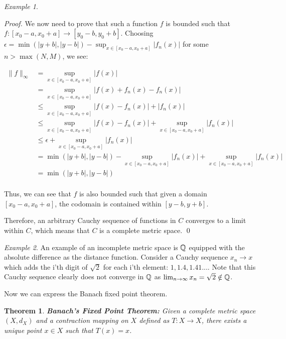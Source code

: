 \documentclass{article}
\newtheorem{theorem}{Theorem}[section]
\theoremstyle{remark}
\newtheorem{example}{Example}
\begin{document}
\begin{example}
\begin{proof}
    We now need to prove that such a function $f$ is bounded such that $f: [x_0 -a, x_0+a] \to [y_0 -b, y_0+b]$. Choosing $\epsilon  = \min(|y+b|, |y-b|) - \sup_{x\in [x_0 -a, x_0+a]} |f_n(x)|$ for some $n>\max(N,M)$, we see:

\begin{align*}
\|f\|_\infty &= \sup_{x\in [x_0 -a, x_0+a]} |f(x)| \\
             &= \sup_{x\in [x_0 -a, x_0+a]} |f(x) + f_n(x) - f_n(x)|\\
             &\leq \sup_{x\in [x_0 -a, x_0+a]} |f(x) -f_n(x)| + | f_n(x)| \\
             &\leq \sup_{x\in [x_0 -a, x_0+a]} |f(x) -f_n(x)| + \sup_{x\in [x_0 -a, x_0+a]}| f_n(x)|\\
             &\leq \epsilon + \sup_{x\in [x_0 -a, x_0+a]}| f_n(x)|\\
             &= \min(|y+b|, |y-b|) - \sup_{x\in [x_0 -a, x_0+a]} |f_n(x)| + \sup_{x\in [x_0 -a, x_0+a]}| f_n(x)|\\
             &= \min(|y+b|, |y-b|)\\
\end{align*}

Thus, we can see that $f$ is also bounded such that given a domain $[x_0 -a, x_0+a]$, the codomain is contained within $[y-b, y+b]$.

Therefore, an arbitrary Cauchy sequence of functions in $C$ converges to a limit within $C$, which means that $C$ is a complete metric space.
\qed
\phantom\qedhere
\end{proof}

\end{example}

\begin{example}
An example of an incomplete metric space is $\Bbb Q$ equipped with the absolute difference as the distance function. Consider a Cauchy sequence $x_n \to x$ which adds the i'th digit of $\sqrt{2}$ for each i'th element: $1, 1.4, 1.41 ... $. Note that this Cauchy sequence clearly does not converge in $\Bbb Q$ as $\lim_{n \to \infty}x_n = \sqrt{2} \notin \Bbb Q $.
\end{example}

Now we can express the Banach fixed point theorem.\\

\begin{theorem} \textbf{Banach's Fixed Point Theorem:} Given a complete metric space $(X, d_X)$ and a contraction mapping on $X$ defined as $T: X \to X$, there exists a unique point $x \in X$ such that $T(x) = x$. 
\end{theorem}
\end{document}
